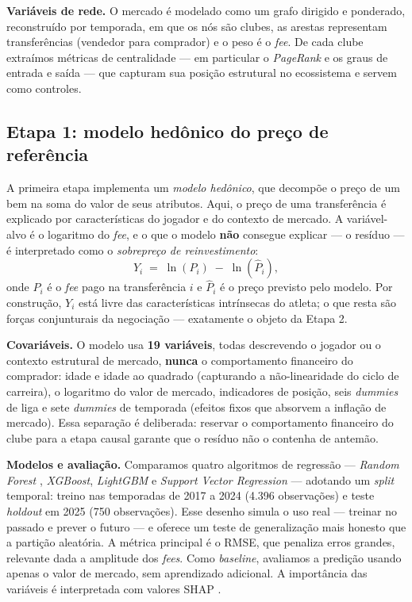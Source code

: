 \textbf{Variáveis de rede.} O mercado é modelado como um grafo dirigido e ponderado, reconstruído
por temporada, em que os nós são clubes, as arestas representam transferências (vendedor para
comprador) e o peso é o \textit{fee}. De cada clube extraímos métricas de centralidade — em
particular o \textit{PageRank} e os graus de entrada e saída — que capturam sua posição estrutural
no ecossistema e servem como controles.

\subsection{Etapa 1: modelo hedônico do preço de referência}

A primeira etapa implementa um \textit{modelo hedônico}, que decompõe o preço de um bem na soma do
valor de seus atributos. Aqui, o preço de uma transferência é explicado por características do
jogador e do contexto de mercado. A variável-alvo é o logaritmo do \textit{fee}, e o que o modelo
\textbf{não} consegue explicar — o resíduo — é interpretado como o \textit{sobrepreço de
reinvestimento}:
%
\begin{equation}
Y_{i} \;=\; \ln(P_i) \;-\; \ln(\hat{P}_i),
\label{eq:residuo}
\end{equation}
%
onde $P_i$ é o \textit{fee} pago na transferência $i$ e $\hat{P}_i$ é o preço previsto pelo modelo.
Por construção, $Y_i$ está livre das características intrínsecas do atleta; o que resta são forças
conjunturais da negociação — exatamente o objeto da Etapa 2.

\textbf{Covariáveis.} O modelo usa \textbf{19 variáveis}, todas descrevendo o jogador ou o contexto
estrutural de mercado, \textbf{nunca} o comportamento financeiro do comprador: idade e idade ao
quadrado (capturando a não-linearidade do ciclo de carreira), o logaritmo do valor de mercado,
indicadores de posição, seis \textit{dummies} de liga e sete \textit{dummies} de temporada (efeitos
fixos que absorvem a inflação de mercado). Essa separação é deliberada: reservar o comportamento
financeiro do clube para a etapa causal garante que o resíduo não o contenha de antemão.

\textbf{Modelos e avaliação.} Comparamos quatro algoritmos de regressão — \textit{Random Forest}
\cite{breiman2001}, \textit{XGBoost}, \textit{LightGBM} e \textit{Support Vector Regression} —
adotando um \textit{split} temporal: treino nas temporadas de 2017 a 2024 (4.396 observações) e
teste \textit{holdout} em 2025 (750 observações). Esse desenho simula o uso real — treinar no
passado e prever o futuro — e oferece um teste de generalização mais honesto que a partição
aleatória. A métrica principal é o RMSE, que penaliza erros grandes, relevante dada a amplitude dos
\textit{fees}. Como \textit{baseline}, avaliamos a predição usando apenas o valor de mercado, sem
aprendizado adicional. A importância das variáveis é interpretada com valores SHAP
\cite{lundberg2017}.

